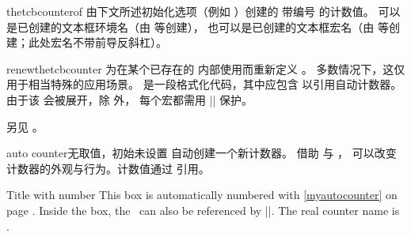 \begin{docCommand}[doc new=2025-07-21]{thetcbcounterof}{}
  由下文所述初始化选项（例如 ）创建的
  带编号  的计数值。
   可以是已创建的文本框环境名（由  等创建），
  也可以是已创建的文本框宏名（由  等创建；此处宏名不带前导反斜杠）。
\end{docCommand}

\begin{docCommand}[doc new=2026-03-05]{renewthetcbcounter}{}
  为在某个已存在的  内部使用而重新定义 。
  多数情况下，这仅用于相当特殊的应用场景。
  是一段格式化代码，其中应包含  以引用自动计数器。
  由于该 会被展开，除  外，
  每个宏都需用 |\noexpand| 保护。

\begin{dispListing}
\end{dispListing}

另见 。
\end{docCommand}


\clearpage
\begin{newTcbKey}{auto counter}{}{无取值，初始未设置}
  自动创建一个新计数器。
  借助  与 ，
  可以改变计数器的外观与行为。计数值通过  引用。


\begin{dispExample}
\begin{pabox}[label={myautocounter}]{Title with number}
This box is automatically numbered with \ref{myautocounter} on page
\pageref{myautocounter}. Inside the box, the \thetcbcounter\ can
also be referenced by |\thetcbcounter|.
The real counter name is \texttt{\tcbcounter}.
\end{pabox}
\end{dispExample}
\end{newTcbKey}


